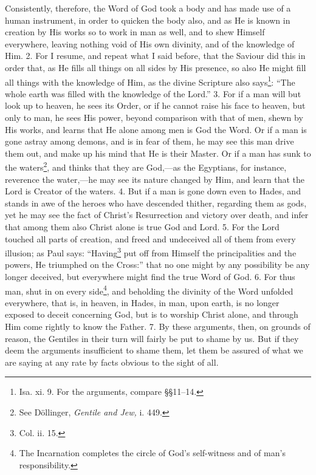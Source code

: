Consistently, therefore, the Word of God took a body and has made use of a human instrument, in order to quicken the body also, and as He is known in creation by His works so to work in man as well, and to shew Himself everywhere, leaving nothing void of His own divinity, and of the knowledge of Him. 2. For I resume, and repeat what I said before, that the Saviour did this in order that, as He fills all things on all sides by His presence, so also He might fill all things with the knowledge of Him, as the divine Scripture also says\footnote{Isa. xi. 9. For the arguments, compare §§11–14.}: “The whole earth was filled with the knowledge of the Lord.” 3. For if a man will but look up to heaven, he sees its Order, or if he cannot raise his face to heaven, but only to man, he sees His power, beyond comparison with that of men, shewn by His works, and learns that He alone among men is God the Word. Or if a man is gone astray among demons, and is in fear of them, he may see this man drive them out, and make up his mind that He is their Master. Or if a man has sunk to the waters\footnote{See Döllinger, \emph{Gentile and Jew,} i. 449.}, and thinks that they are God,—as the Egyptians, for instance, reverence the water,—he may see its nature changed by Him, and learn that the Lord is Creator of the waters. 4. But if a man is gone down even to Hades, and stands in awe of the heroes who have descended thither, regarding them as gods, yet he may see the fact of Christ’s Resurrection and victory over death, and infer that among them also Christ alone is true God and Lord. 5. For the Lord touched all parts of creation, and freed and undeceived all of them from every illusion; as Paul says: “Having\footnote{Col. ii. 15.} put off from Himself the principalities and the powers, He triumphed on the Cross:” that no one might by any possibility be any longer deceived, but everywhere might find the true Word of God. 6. For thus man, shut in on every side\footnote{The Incarnation completes the circle of God’s self-witness and of man’s responsibility.}, and beholding the divinity of the Word unfolded everywhere, that is, in heaven, in Hades, in man, upon earth, is no longer exposed to deceit concerning God, but is to worship Christ alone, and through Him come rightly to know the Father. 7. By these arguments, then, on grounds of reason, the Gentiles in their turn will fairly be put to shame by us. But if they deem the arguments insufficient to shame them, let them be assured of what we are saying at any rate by facts obvious to the sight of all.

